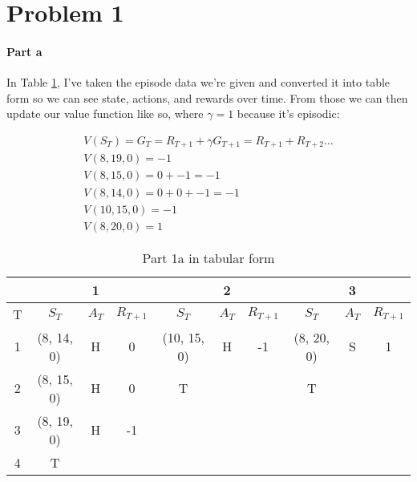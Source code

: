 \documentclass[12pt]{article}
\begin{document}
\maketitle

\section{Problem 1}

\paragraph{Part a} In Table \ref{tab:1a}, I've taken the episode data we're given and converted it into table form so we can see state, actions, and rewards over time. From those we can then update our value function like so, where $\gamma = 1$ because it's episodic:

\begin{gather*}
  V(S_T) = G_T = R_{T+1} + \gamma G_{T+1} = R_{T+1} + R_{T+2} \dots \\
  V(8, 19, 0) = -1 \\
  V(8, 15, 0) = 0 + -1 = -1 \\
  V(8, 14, 0) = 0 + 0 + -1 = -1 \\
  V(10, 15, 0) = -1 \\
  V(8, 20, 0) = 1
\end{gather*}

\begin{table}[!htb]
  \centering
  \caption{Part 1a in tabular form}
  \label{tab:1a}
  \begin{tabular}{|c||c|c|c||c|c|c||c|c|c|}
    \hline
      &            & 1     &           &             & 2     &           &            & 3     &           \\ \hline
    T & $S_T$      & $A_T$ & $R_{T+1}$ & $S_T$       & $A_T$ & $R_{T+1}$ & $S_T$      & $A_T$ & $R_{T+1}$ \\ \hline
    1 & (8, 14, 0) & H     & 0         & (10, 15, 0) & H     & -1        & (8, 20, 0) & S     & 1         \\ \hline
    2 & (8, 15, 0) & H     & 0         & T           &       &           & T          &       &           \\ \hline
    3 & (8, 19, 0) & H     & -1        &             &       &           &            &       &           \\ \hline
    4 & T          &       &           &             &       &           &            &       &           \\ \hline
  \end{tabular}
\end{table}
\end{document}
